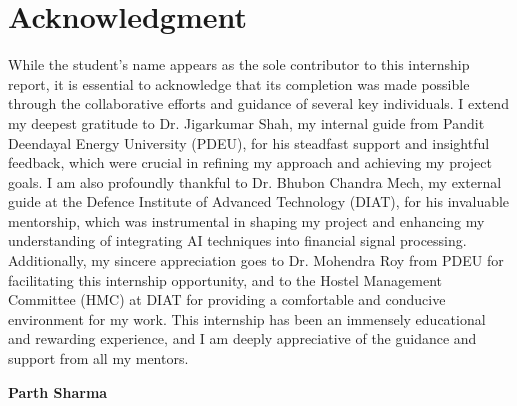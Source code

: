 
\section*{\textcolor{internationalkleinblue}{\textbf{Acknowledgment}}}
While the student's name appears as the sole contributor to this internship report, it is essential to acknowledge that its completion was made possible through the collaborative efforts and guidance of several key individuals. I extend my deepest gratitude to Dr. Jigarkumar Shah, my internal guide from Pandit Deendayal Energy University (PDEU), for his steadfast support and insightful feedback, which were crucial in refining my approach and achieving my project goals. I am also profoundly thankful to Dr. Bhubon Chandra Mech, my external guide at the Defence Institute of Advanced Technology (DIAT), for his invaluable mentorship, which was instrumental in shaping my project and enhancing my understanding of integrating AI techniques into financial signal processing. Additionally, my sincere appreciation goes to Dr. Mohendra Roy from PDEU for facilitating this internship opportunity, and to the Hostel Management Committee (HMC) at DIAT for providing a comfortable and conducive environment for my work. This internship has been an immensely educational and rewarding experience, and I am deeply appreciative of the guidance and support from all my mentors.

\begin{flushright}
\textbf{Parth Sharma}\\
\end{flushright}

\newpage
